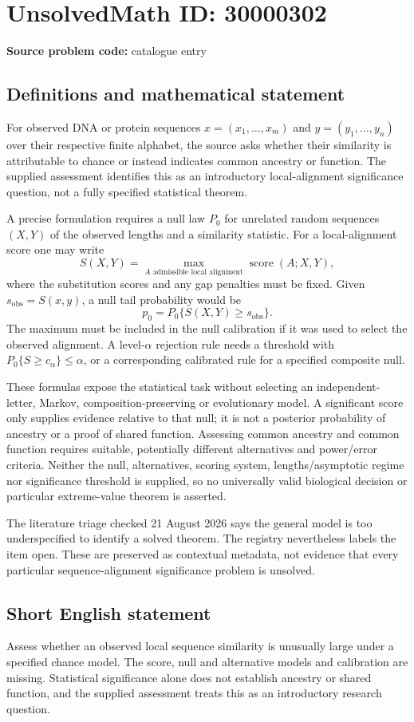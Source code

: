 \documentclass[11pt]{article}
\begin{document}
\section*{UnsolvedMath ID: 30000302}
\textbf{Source problem code:} catalogue entry
\subsection{Definitions and mathematical statement}
For observed DNA or protein sequences $x=(x_1,\ldots,x_m)$ and $y=(y_1,\ldots,y_n)$ over their respective finite alphabet, the source asks whether their similarity is attributable to chance or instead indicates common ancestry or function. The supplied assessment identifies this as an introductory local-alignment significance question, not a fully specified statistical theorem.

A precise formulation requires a null law $P_0$ for unrelated random sequences $(X,Y)$ of the observed lengths and a similarity statistic. For a local-alignment score one may write
\[
 S(X,Y)=\max_{A\text{ admissible local alignment}}\operatorname{score}(A;X,Y),
\]
where the substitution scores and any gap penalties must be fixed. Given $s_{\mathrm{obs}}=S(x,y)$, a null tail probability would be
\[
 p_0=P_0\{S(X,Y)\geq s_{\mathrm{obs}}\}.
\]
The maximum must be included in the null calibration if it was used to select the observed alignment. A level-$\alpha$ rejection rule needs a threshold with $P_0\{S\geq c_\alpha\}\leq\alpha$, or a corresponding calibrated rule for a specified composite null.

These formulas expose the statistical task without selecting an independent-letter, Markov, composition-preserving or evolutionary model. A significant score only supplies evidence relative to that null; it is not a posterior probability of ancestry or a proof of shared function. Assessing common ancestry and common function requires suitable, potentially different alternatives and power/error criteria. Neither the null, alternatives, scoring system, lengths/asymptotic regime nor significance threshold is supplied, so no universally valid biological decision or particular extreme-value theorem is asserted.

The literature triage checked 21 August 2026 says the general model is too underspecified to identify a solved theorem. The registry nevertheless labels the item open. These are preserved as contextual metadata, not evidence that every particular sequence-alignment significance problem is unsolved.
\subsection{Short English statement}
Assess whether an observed local sequence similarity is unusually large under a specified chance model. The score, null and alternative models and calibration are missing. Statistical significance alone does not establish ancestry or shared function, and the supplied assessment treats this as an introductory research question.
\end{document}

